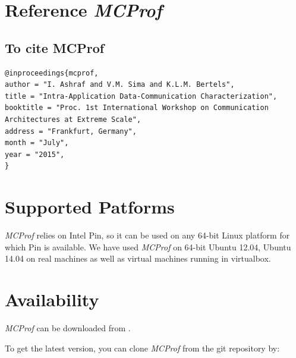\documentclass[10pt]{article}
\newcommand{\MCPROF}{\emph{MCProf}}
\begin{document}
\section{Reference \MCPROF{}}

\subsection{To cite MCProf}

{
\tiny
\begin{Verbatim}[frame=single, samepage=true]
@inproceedings{mcprof,
author = "I. Ashraf and V.M. Sima and K.L.M. Bertels",
title = "Intra-Application Data-Communication Characterization",
booktitle = "Proc. 1st International Workshop on Communication Architectures at Extreme Scale",
address = "Frankfurt, Germany",
month = "July",
year = "2015",
}
\end{Verbatim}
}

% 


\section{Supported Patforms}
\label{sec:platform}

\MCPROF{} relies on Intel Pin, so it can be used on any 64-bit Linux platform for 
which Pin is available. We have used \MCPROF{} on 64-bit Ubuntu 12.04, Ubuntu 
14.04 on real machines as well as virtual machines running in virtualbox.

\section{Availability}
\label{sec:availability}

\MCPROF{} can be downloaded from \cite{mcprofDownload}.

To get the latest version, you can clone \MCPROF{} from the git repository by:
\end{document}
